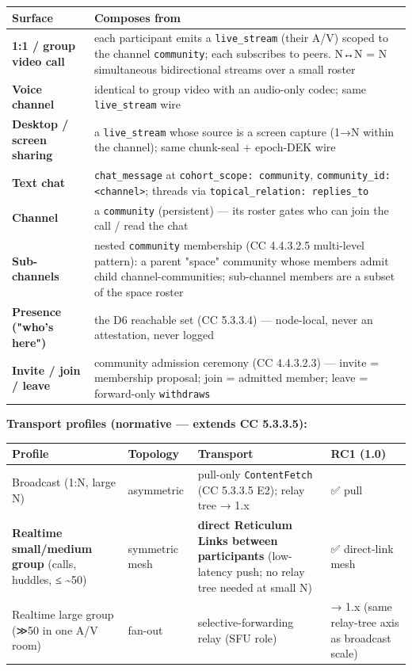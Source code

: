 \documentclass[11pt]{article}
\begin{document}
{\footnotesize
\begin{longtable}{|p{8.0cm}|p{8.0cm}|}\hline
\textbf{Surface} & \textbf{Composes from} \\ \hline\endhead
\textbf{1:1 / group video call} & each participant emits a \texttt{live\_stream} (their A/V) scoped to the channel \texttt{community}; each subscribes to peers. N↔N = N simultaneous bidirectional streams over a small roster \\ \hline
\textbf{Voice channel} & identical to group video with an audio-only codec; same \texttt{live\_stream} wire \\ \hline
\textbf{Desktop / screen sharing} & a \texttt{live\_stream} whose source is a screen capture (1→N within the channel); same chunk-seal + epoch-DEK wire \\ \hline
\textbf{Text chat} & \texttt{chat\_message} at \texttt{cohort\_scope: community}, \texttt{community\_id: <channel>}; threads via \texttt{topical\_relation: replies\_to} \\ \hline
\textbf{Channel} & a \texttt{community} (persistent) — its roster gates who can join the call / read the chat \\ \hline
\textbf{Sub-channels} & nested \texttt{community} membership (CC 4.4.3.2.5 multi-level pattern): a parent "space" community whose members admit child channel-communities; sub-channel members are a subset of the space roster \\ \hline
\textbf{Presence ("who's here")} & the D6 reachable set (CC 5.3.3.4) — node-local, never an attestation, never logged \\ \hline
\textbf{Invite / join / leave} & community admission ceremony (CC 4.4.3.2.3) — invite = membership proposal; join = admitted member; leave = forward-only \texttt{withdraws} \\ \hline
\end{longtable}}


\textbf{Transport profiles (normative — extends CC 5.3.3.5):}


{\scriptsize
\begin{longtable}{|p{4.0cm}|p{4.0cm}|p{4.0cm}|p{4.0cm}|}\hline
\textbf{Profile} & \textbf{Topology} & \textbf{Transport} & \textbf{RC1 (1.0)} \\ \hline\endhead
Broadcast (1:N, large N) & asymmetric & pull-only \texttt{ContentFetch} (CC 5.3.3.5 E2); relay tree → 1.x & ✅ pull \\ \hline
\textbf{Realtime small/medium group} (calls, huddles, ≤ \textasciitilde{}50) & symmetric mesh & \textbf{direct Reticulum Links between participants} (low-latency push; no relay tree needed at small N) & ✅ direct-link mesh \\ \hline
Realtime large group (≫50 in one A/V room) & fan-out & selective-forwarding relay (SFU role) & → 1.x (same relay-tree axis as broadcast scale) \\ \hline
\end{longtable}}
\end{document}
